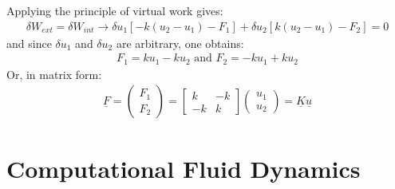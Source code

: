 \documentclass[class=report, crop=false, 12pt,a4paper]{standalone}
\begin{document}
Applying the principle of virtual work gives:
\begin{gather}
	\delta W_{ext} = \delta W_{int} \rightarrow \delta u_1 \left[-k\left(u_2 - u_1\right)-F_1\right] + \delta u_2 \left[k\left(u_2 - u_1\right)-F_2\right] = 0
\end{gather}
and since $\delta u_1$ and $\delta u_2$ are arbitrary, one obtains:
\begin{gather}
	F_1 = ku_1 - ku_2 \textrm{ and } F_2 = -ku_1 + ku_2
\end{gather}
Or, in matrix form:
\begin{gather}
	\underline{F} = \begin{pmatrix}
		F_1\\
		F_2
	\end{pmatrix} = \begin{bmatrix}
		k & -k\\
		-k & k
	\end{bmatrix}\begin{pmatrix}
		u_1\\
		u_2
	\end{pmatrix} = \underline{K}\underline{u}
\end{gather}
\chapter{Computational Fluid Dynamics}
\end{document}
